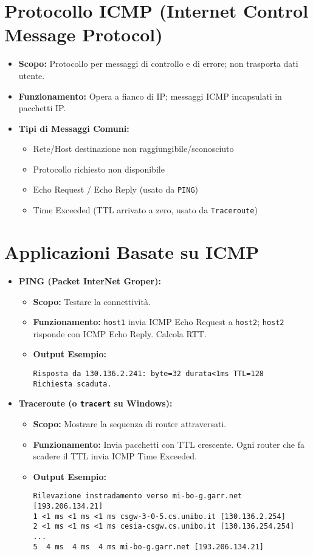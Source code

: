 \documentclass{article}
\begin{document}
\section{Protocollo ICMP (Internet Control Message Protocol)}
\begin{itemize}
    \item \textbf{Scopo:} Protocollo per messaggi di controllo e di errore; non trasporta dati utente.
    \item \textbf{Funzionamento:} Opera a fianco di IP; messaggi ICMP incapsulati in pacchetti IP.
    \item \textbf{Tipi di Messaggi Comuni:}
    \begin{itemize}
        \item Rete/Host destinazione non raggiungibile/sconosciuto
        \item Protocollo richiesto non disponibile
        \item Echo Request / Echo Reply (usato da \texttt{PING})
        \item Time Exceeded (TTL arrivato a zero, usato da \texttt{Traceroute})
    \end{itemize}
\end{itemize}

\section{Applicazioni Basate su ICMP}
\begin{itemize}
    \item \textbf{PING (Packet InterNet Groper):}
    \begin{itemize}
        \item \textbf{Scopo:} Testare la connettività.
        \item \textbf{Funzionamento:} \texttt{host1} invia ICMP Echo Request a \texttt{host2}; \texttt{host2} risponde con ICMP Echo Reply. Calcola RTT.
        \item \textbf{Output Esempio:}
\begin{verbatim}
Risposta da 130.136.2.241: byte=32 durata<1ms TTL=128
Richiesta scaduta.
\end{verbatim}
    \end{itemize}
    \item \textbf{Traceroute (o \texttt{tracert} su Windows):}
    \begin{itemize}
        \item \textbf{Scopo:} Mostrare la sequenza di router attraversati.
        \item \textbf{Funzionamento:} Invia pacchetti con TTL crescente. Ogni router che fa scadere il TTL invia ICMP Time Exceeded.
        \item \textbf{Output Esempio:}
\begin{verbatim}
Rilevazione instradamento verso mi-bo-g.garr.net [193.206.134.21]
1 <1 ms <1 ms <1 ms csgw-3-0-5.cs.unibo.it [130.136.2.254]
2 <1 ms <1 ms <1 ms cesia-csgw.cs.unibo.it [130.136.254.254]
...
5  4 ms  4 ms  4 ms mi-bo-g.garr.net [193.206.134.21]
\end{verbatim}
    \end{itemize}
\end{itemize}
\end{document}
